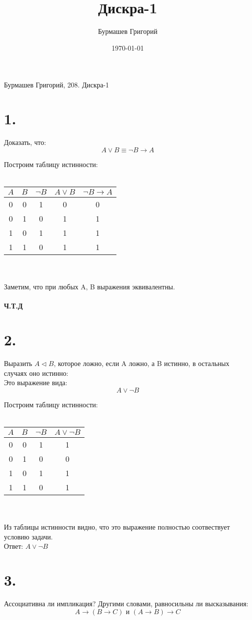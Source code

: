 \documentclass[a4paper,12pt]{article}
\author{Бурмашев Григорий}
\title{Дискра-1}
\date{\today}
\begin{document}
\begin{center}
Бурмашев Григорий, 208. Дискра-1
\end{center}
\section*{1.}
Доказать, что:\[A \vee B \equiv \neg B \rightarrow A \] 

Построим таблицу истинности:\\\\
\begin{tabular}{|c|c|c|c|c|}
\hline
 $A$& $B $& $ \neg B $&   $A \vee B$ & $\neg B \rightarrow A$ \\
\hline
 0&  0&  1&0 & 0 \\
\hline
 0& 1 & 0 & 1& 1\\
\hline
 1& 0 & 1 & 1 &1\\
\hline
1 & 1 &0 & 1&1\\
\hline 
\end{tabular}\\\\
Заметим, что при любых A, B выражения эквивалентны.\\\\
 \textbf{Ч.Т.Д}
\section*{2.} 
Выразить  $A \triangleleft B $, которое ложно, если A ложно, а B истинно, в остальных случаях оно истинно:\\

Это выражение вида: \[ A \vee \neg B \]

Построим таблицу истинности:\\\\
\begin{tabular}{|c|c|c|c|}
\hline
$ A $ & $ B $ & $ \neg B $ & $ A \vee \neg B $ \\
\hline
0 & 0 & 1 & 1 \\
\hline
0 & 1 & 0 & 0 \\
\hline
1 & 0 & 1 & 1 \\
\hline
1 & 1 & 0 & 1\\
\hline
\end{tabular}\\\\
Из таблицы истинности видно, что это выражение полностью соотвествует условию задачи.\\

Ответ: $ A \vee \neg B $
\section*{3.}
Ассоциативна ли импликация? Другими словами, равносильны ли высказывания:
\[A \rightarrow (B \rightarrow C) \text{ и } (A \rightarrow B) \rightarrow C \]\\
\end{document}

